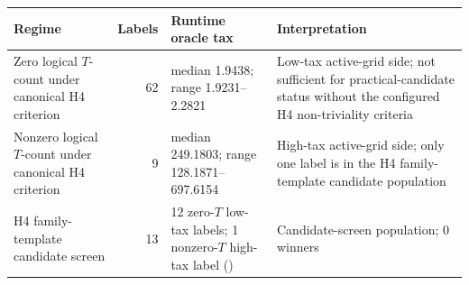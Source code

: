 \begin{tabularx}{\textwidth}{@{}P{3.25cm}rP{3.35cm}L@{}}
\toprule
\textbf{Regime} & \textbf{Labels} & \textbf{Runtime oracle tax} & \textbf{Interpretation} \\
\midrule
Zero logical \(T\)-count under canonical H4 criterion & 62 & median 1.9438; range 1.9231--2.2821 & Low-tax active-grid side; not sufficient for practical-candidate status without the configured H4 non-triviality criteria \\
Nonzero logical \(T\)-count under canonical H4 criterion & 9 & median 249.1803; range 128.1871--697.6154 & High-tax active-grid side; only one label is in the H4 family-template candidate population \\
H4 family-template candidate screen & 13 & 12 zero-\(T\) low-tax labels; 1 nonzero-\(T\) high-tax label () & Candidate-screen population; 0 winners \\
\bottomrule
\end{tabularx}
